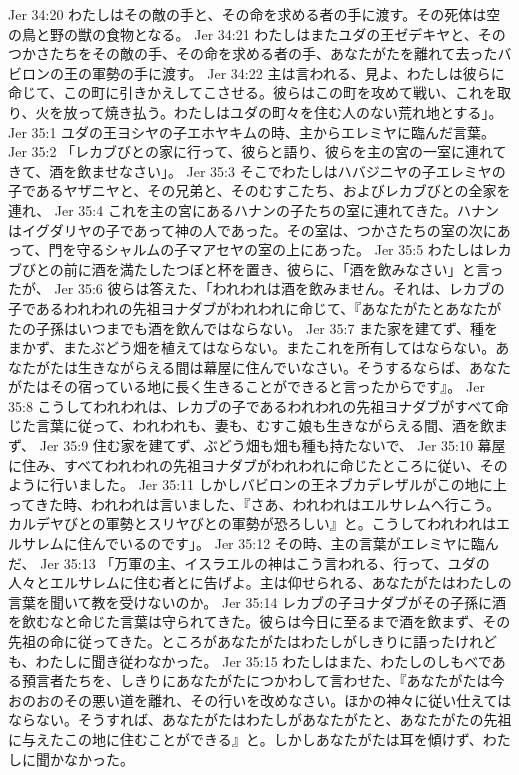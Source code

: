 Jer 34:20  わたしはその敵の手と、その命を求める者の手に渡す。その死体は空の鳥と野の獣の食物となる。
Jer 34:21  わたしはまたユダの王ゼデキヤと、そのつかさたちをその敵の手、その命を求める者の手、あなたがたを離れて去ったバビロンの王の軍勢の手に渡す。
Jer 34:22  主は言われる、見よ、わたしは彼らに命じて、この町に引きかえしてこさせる。彼らはこの町を攻めて戦い、これを取り、火を放って焼き払う。わたしはユダの町々を住む人のない荒れ地とする」。
Jer 35:1  ユダの王ヨシヤの子エホヤキムの時、主からエレミヤに臨んだ言葉。
Jer 35:2  「レカブびとの家に行って、彼らと語り、彼らを主の宮の一室に連れてきて、酒を飲ませなさい」。
Jer 35:3  そこでわたしはハバジニヤの子エレミヤの子であるヤザニヤと、その兄弟と、そのむすこたち、およびレカブびとの全家を連れ、
Jer 35:4  これを主の宮にあるハナンの子たちの室に連れてきた。ハナンはイグダリヤの子であって神の人であった。その室は、つかさたちの室の次にあって、門を守るシャルムの子マアセヤの室の上にあった。
Jer 35:5  わたしはレカブびとの前に酒を満たしたつぼと杯を置き、彼らに、「酒を飲みなさい」と言ったが、
Jer 35:6  彼らは答えた、「われわれは酒を飲みません。それは、レカブの子であるわれわれの先祖ヨナダブがわれわれに命じて、『あなたがたとあなたがたの子孫はいつまでも酒を飲んではならない。
Jer 35:7  また家を建てず、種をまかず、またぶどう畑を植えてはならない。またこれを所有してはならない。あなたがたは生きながらえる間は幕屋に住んでいなさい。そうするならば、あなたがたはその宿っている地に長く生きることができると言ったからです』。
Jer 35:8  こうしてわれわれは、レカブの子であるわれわれの先祖ヨナダブがすべて命じた言葉に従って、われわれも、妻も、むすこ娘も生きながらえる間、酒を飲まず、
Jer 35:9  住む家を建てず、ぶどう畑も畑も種も持たないで、
Jer 35:10  幕屋に住み、すべてわれわれの先祖ヨナダブがわれわれに命じたところに従い、そのように行いました。
Jer 35:11  しかしバビロンの王ネブカデレザルがこの地に上ってきた時、われわれは言いました、『さあ、われわれはエルサレムへ行こう。カルデヤびとの軍勢とスリヤびとの軍勢が恐ろしい』と。こうしてわれわれはエルサレムに住んでいるのです」。
Jer 35:12  その時、主の言葉がエレミヤに臨んだ、
Jer 35:13  「万軍の主、イスラエルの神はこう言われる、行って、ユダの人々とエルサレムに住む者とに告げよ。主は仰せられる、あなたがたはわたしの言葉を聞いて教を受けないのか。
Jer 35:14  レカブの子ヨナダブがその子孫に酒を飲むなと命じた言葉は守られてきた。彼らは今日に至るまで酒を飲まず、その先祖の命に従ってきた。ところがあなたがたはわたしがしきりに語ったけれども、わたしに聞き従わなかった。
Jer 35:15  わたしはまた、わたしのしもべである預言者たちを、しきりにあなたがたにつかわして言わせた、『あなたがたは今おのおのその悪い道を離れ、その行いを改めなさい。ほかの神々に従い仕えてはならない。そうすれば、あなたがたはわたしがあなたがたと、あなたがたの先祖に与えたこの地に住むことができる』と。しかしあなたがたは耳を傾けず、わたしに聞かなかった。
